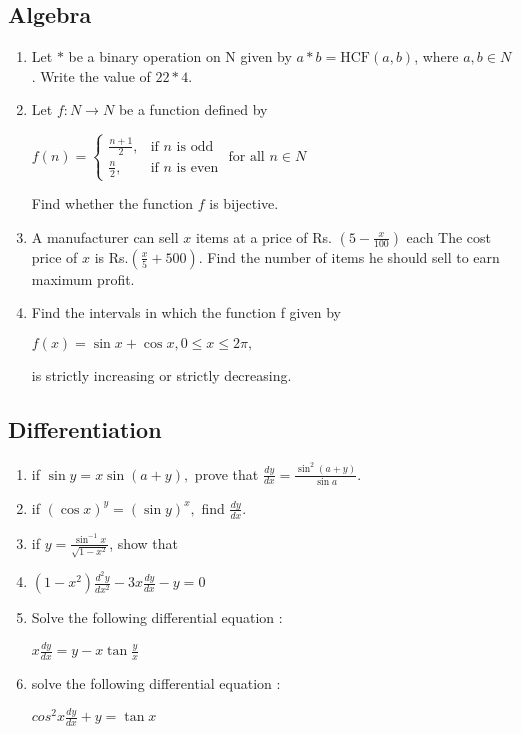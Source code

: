 \documentclass{article}
\begin{document}
\subsection*{Algebra}
\begin{enumerate}
\item 
Let $*$ be a binary operation on N given by $a * b = \text{HCF}(a, b)$, where $a, b \in N$. Write the value of $22 * 4$.

\item 
Let $f : N \rightarrow N $ be a function defined by
\begin{center}
$
f(n) = 
\begin{cases} 
\frac{n+1}{2}, & \text{if }  n \text{ is odd} \\
\frac{n}{2}, & \text{if } n \text{ is even}
\end{cases}
\text{ for all } n \in N $
\end{center}
Find whether the function $f$ is bijective.

\item 
A manufacturer can sell $x$ items at a price of Rs. $\left(5 - \frac{x}{100}\right)$ each The cost price of $x$ is Rs.$\left(\frac{x}{5} + 500\right)$. Find the number of items he should sell to earn maximum profit.

\item 
Find the intervals in which the function f given by
\begin{center}
$f(x) = \sin x + \cos x, 0 \leq x \leq 2\pi,$   
\end{center}
is strictly increasing or strictly decreasing.
\end{enumerate}

\subsection*{Differentiation}
\begin{enumerate}
    \item if $\sin y = x \sin(a + y),$ prove that $\frac{dy}{dx} = \frac{\sin^2(a+y)}{\sin a}.$
    \item if $(\cos x)^y = (\sin y)^x, $ find $\frac{dy}{dx}.$
    \item if $y = \frac{\sin^{-1} x}{\sqrt{1-x^2}}$, show that
    \item $(1 - x^2)\frac{d^2{y}}{dx^2}-3x\frac{dy}{dx} - y = 0$
    \item Solve the following differential equation :
\begin{center}
$x \frac{dy}{dx} = y - x \tan \frac{y}{x}$
\end{center} 
\item solve the following differential equation :
\begin{center}
${cos^{2}} {x} \frac{dy}{dx} + y = \tan x$
\end{center} 
\end{enumerate}
\end{document}
